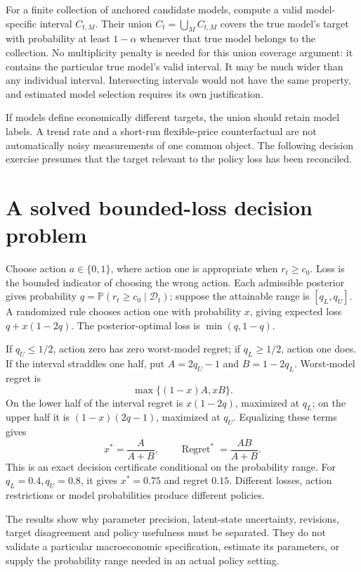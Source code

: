 \documentclass[11pt,a4paper]{article}
\newcommand{\Prb}{\mathbb P}
\begin{document}
For a finite collection of anchored candidate models, compute a valid model-specific interval $C_{t,M}$. Their union $C_t=\bigcup_M C_{t,M}$ covers the true model's target with probability at least $1-\alpha$ whenever that true model belongs to the collection. No multiplicity penalty is needed for this union coverage argument: it contains the particular true model's valid interval. It may be much wider than any individual interval. Intersecting intervals would not have the same property, and estimated model selection requires its own justification.

If models define economically different targets, the union should retain model labels. A trend rate and a short-run flexible-price counterfactual are not automatically noisy measurements of one common object. The following decision exercise presumes that the target relevant to the policy loss has been reconciled.

\section{A solved bounded-loss decision problem}
Choose action $a\in\{0,1\}$, where action one is appropriate when $r_t\ge c_0$. Loss is the bounded indicator of choosing the wrong action. Each admissible posterior gives probability $q=\Prb(r_t\ge c_0\mid\mathcal D_t)$; suppose the attainable range is $[q_L,q_U]$. A randomized rule chooses action one with probability $x$, giving expected loss $q+x(1-2q)$. The posterior-optimal loss is $\min(q,1-q)$.

If $q_U\le1/2$, action zero has zero worst-model regret; if $q_L\ge1/2$, action one does. If the interval straddles one half, put $A=2q_U-1$ and $B=1-2q_L$. Worst-model regret is
\[
 \max\{(1-x)A,xB\}.
\]
On the lower half of the interval regret is $x(1-2q)$, maximized at $q_L$; on the upper half it is $(1-x)(2q-1)$, maximized at $q_U$. Equalizing these terms gives
\[
 x^*=\frac{A}{A+B},\qquad \operatorname{Regret}^*=\frac{AB}{A+B}. \tag{4}
\]
This is an exact decision certificate conditional on the probability range. For $q_L=0.4,q_U=0.8$, it gives $x^*=0.75$ and regret $0.15$. Different losses, action restrictions or model probabilities produce different policies.

The results show why parameter precision, latent-state uncertainty, revisions, target disagreement and policy usefulness must be separated. They do not validate a particular macroeconomic specification, estimate its parameters, or supply the probability range needed in an actual policy setting.
\end{document}
